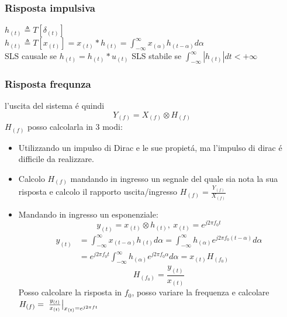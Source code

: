         \subsubsection{Risposta impulsiva}
            $h_{(t)} \triangleq T[\delta_{(t)}]$\\
            $h_{(t)} \triangleq T[x_{(t)}] = x_{(t)}\ast h_{(t)} = \int_{-\infty}^{\infty}x_{(\alpha)}h_{(t-\alpha)}d\alpha$\\
            SLS causale se $h_{(t)} = h_{(t)}\ast u_{(t)}$ 
            SLS stabile se $\int_{-\infty}^{\infty}|h_{(t)}| dt < +\infty$ 
        \subsubsection{Risposta frequnza}
            l'uscita del sistema é quindi 
            \[
                Y_{(f)} = X_{(f)}\otimes H_{(f)}
            \]
            $H_{(f)}$ posso calcolarla in 3 modi:
            \begin{itemize}
                \item {
                    Utilizzando un impulso di Dirac e le sue propietá, ma l'impulso di dirac é difficile da realizzare. 
                }
                \item {
                    Calcolo $H_{(f)}$ mandando in ingresso un segnale del quale sia nota la sua risposta e calcolo il rapporto uscita/ingresso 
                    $H_{(f)} = \frac{Y_{(f)}}{X_{(f)}}$
                }
                \item {
                    Mandando in ingresso un esponenziale:
                    \[
                        y_{(t)} = x_{(t)}\otimes h_{(t)},\ x_{(t)} = e^{j2\pi f_0t}
                    \]
                    \begin{align}
                        y_{(t)} &= \int_{-\infty}^{\infty}x_{(t-\alpha)}h_{(t)}d\alpha = \int_{-\infty}^{\infty}h_{(\alpha)} e^{j2\pi f_0(t-\alpha)}d\alpha \nonumber \\
                                &= e^{j2\pi f_0t}\int_{-\infty}^{\infty}h_{(\alpha)} e^{j2\pi f_0\alpha}d\alpha = x_{(t)}H_{(f_0)} \nonumber 
                    \end{align}
                    \[
                        H_{(f_0)} = \frac{y_{(t)}}{x_{(t)}}
                    \]  
                    Posso calcolare la risposta in $f_0$, posso variare la frequenza e calcolare $H_{(f)} = \eval*{\frac{y_{(t)}}{x_{(t)}}}_{x_{(t)} = e^{j2\pi ft}}$
                }
            \end{itemize}

